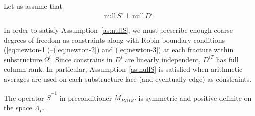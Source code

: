 \begin{assumption}
\label{as:nullS}Let us assume that
\begin{equation}
\mathrm{null}\,S^{i} \perp \mathrm{null}\,D^{i}.
\end{equation}
\end{assumption}

In order to satisfy Assumption~\ref{as:nullS}, we must prescribe enough coarse
degrees of freedom as constraints along with Robin boundary conditions
(\ref{eq:newton-1})--(\ref{eq:newton-2}) and (\ref{eq:newton-3}) at each fracture within
substructure$~\Omega^{i}$. 
Since constrains in $D^{i}$ are linearly independent, $D^{iT}$ has full column rank. 
In particular,
Assumption~\ref{as:nullS} is satisfied when arithmetic averages are used on
each substructure face (and eventually edge) as constraints.

\begin{lemma}
\label{lemma:positive_definite_preconditioner} The operator $\widetilde{S}^{-1}$ in 
preconditioner $M_{BDDC}$ is symmetric and positive definite on the space $\widetilde{\Lambda}_{\Gamma}$.
\end{lemma}

